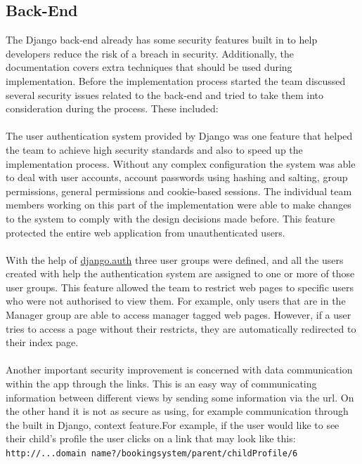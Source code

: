 \documentclass{l3proj}
\begin{document}
\subsection{Back-End}
The Django back-end already has some security features built in to help developers reduce the risk of a breach in security. Additionally, the documentation covers extra techniques that should be used during implementation. Before the implementation process started the team discussed several security issues related to the back-end and tried to take them into consideration during the process. These included:\\
\\
The user authentication system provided by Django was one feature that helped the team to achieve high security standards and also to speed up the implementation process. Without any complex configuration the system was able to deal with user accounts, account passwords using hashing and salting, group permissions, general permissions and cookie-based sessions. The individual team members working on this part of the implementation were able to make changes to the system to comply with the design decisions made before. This feature protected the entire web application from unauthenticated users.\\
\\
With the help of \underline{django.auth} three user groups were defined, and all the users created with help the authentication system are assigned to one or more of those user groups. This feature allowed the team to restrict web pages to specific users who were not authorised to view them. For example, only users that are in the Manager group are able to access manager tagged web pages. However, if a user tries to access a page without their restricts, they are automatically redirected to their index page. \\
\\
Another important security improvement is concerned with data communication within the app through the links. This is an easy way of communicating information between different views by sending some information via the url. On the other hand it is not as secure as using, for example communication through the built in Django, context feature.For example, if the user would like to see their child's profile the user clicks on a link that may look like this:\\
\texttt{http://...domain name?/bookingsystem/parent/childProfile/6}
\end{document}

